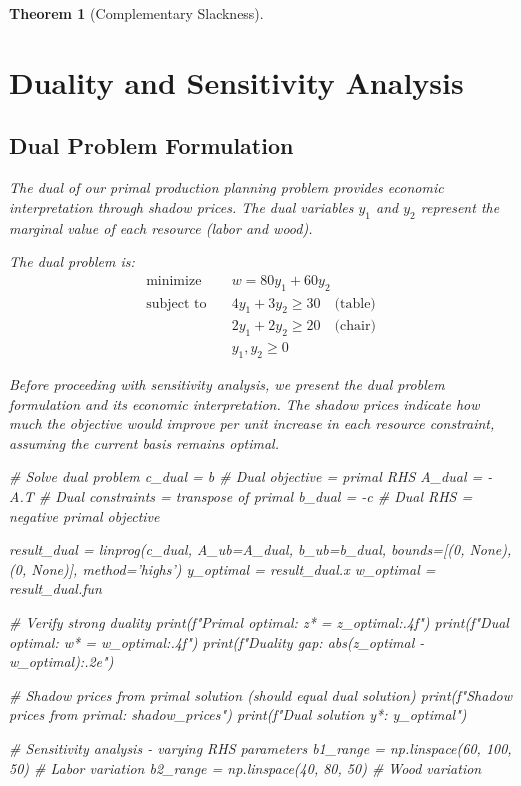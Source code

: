 \documentclass[a4paper, 11pt]{article}
\newtheorem{theorem}{Theorem}[section]
\begin{document}
\begin{theorem}[Complementary Slackness]
\section{Duality and Sensitivity Analysis}

\subsection{Dual Problem Formulation}

The dual of our primal production planning problem provides economic interpretation through
shadow prices. The dual variables $y_1$ and $y_2$ represent the marginal value of each
resource (labor and wood).

The dual problem is:
\begin{equation}
\begin{aligned}
\text{minimize} \quad & w = 80y_1 + 60y_2 \\
\text{subject to} \quad & 4y_1 + 3y_2 \geq 30 \quad \text{(table)} \\
& 2y_1 + 2y_2 \geq 20 \quad \text{(chair)} \\
& y_1, y_2 \geq 0
\end{aligned}
\end{equation}

Before proceeding with sensitivity analysis, we present the dual problem formulation and
its economic interpretation. The shadow prices indicate how much the objective would improve
per unit increase in each resource constraint, assuming the current basis remains optimal.

\begin{pycode}
# Solve dual problem
c_dual = b  # Dual objective = primal RHS
A_dual = -A.T  # Dual constraints = transpose of primal
b_dual = -c  # Dual RHS = negative primal objective

result_dual = linprog(c_dual, A_ub=A_dual, b_ub=b_dual,
                     bounds=[(0, None), (0, None)], method='highs')
y_optimal = result_dual.x
w_optimal = result_dual.fun

# Verify strong duality
print(f"Primal optimal: z* = {z_optimal:.4f}")
print(f"Dual optimal: w* = {w_optimal:.4f}")
print(f"Duality gap: {abs(z_optimal - w_optimal):.2e}")

# Shadow prices from primal solution (should equal dual solution)
print(f"Shadow prices from primal: {shadow_prices}")
print(f"Dual solution y*: {y_optimal}")

# Sensitivity analysis - varying RHS parameters
b1_range = np.linspace(60, 100, 50)  # Labor variation
b2_range = np.linspace(40, 80, 50)   # Wood variation


\end{pycode}
\end{theorem}
\end{document}
